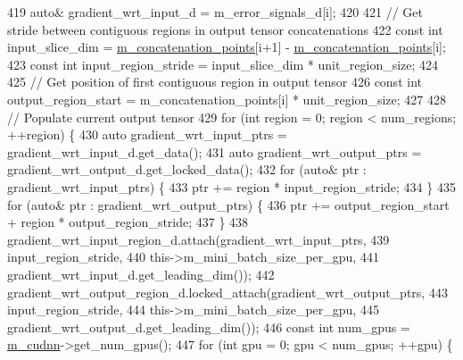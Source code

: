 \begin{DoxyCode}
419       \textcolor{keyword}{auto}& gradient\_wrt\_input\_d = m\_error\_signals\_d[i];
420 
421       \textcolor{comment}{// Get stride between contiguous regions in output tensor concatenations}
422       \textcolor{keyword}{const} \textcolor{keywordtype}{int} input\_slice\_dim = \hyperlink{classlbann_1_1concatenation__layer_a363324fe6cd104740334f3396085328c}{m\_concatenation\_points}[i+1] - 
      \hyperlink{classlbann_1_1concatenation__layer_a363324fe6cd104740334f3396085328c}{m\_concatenation\_points}[i];
423       \textcolor{keyword}{const} \textcolor{keywordtype}{int} input\_region\_stride = input\_slice\_dim * unit\_region\_size;
424 
425       \textcolor{comment}{// Get position of first contiguous region in output tensor}
426       \textcolor{keyword}{const} \textcolor{keywordtype}{int} output\_region\_start = m\_concatenation\_points[i] * unit\_region\_size;
427 
428       \textcolor{comment}{// Populate current output tensor}
429       \textcolor{keywordflow}{for} (\textcolor{keywordtype}{int} region = 0; region < num\_regions; ++region) \{
430         \textcolor{keyword}{auto} gradient\_wrt\_input\_ptrs = gradient\_wrt\_input\_d.get\_data();
431         \textcolor{keyword}{auto} gradient\_wrt\_output\_ptrs = gradient\_wrt\_output\_d.get\_locked\_data();
432         \textcolor{keywordflow}{for} (\textcolor{keyword}{auto}& ptr : gradient\_wrt\_input\_ptrs) \{
433           ptr += region * input\_region\_stride;
434         \}
435         \textcolor{keywordflow}{for} (\textcolor{keyword}{auto}& ptr : gradient\_wrt\_output\_ptrs) \{
436           ptr += output\_region\_start + region * output\_region\_stride;
437         \}
438         gradient\_wrt\_input\_region\_d.attach(gradient\_wrt\_input\_ptrs,
439                                            input\_region\_stride,
440                                            this->m\_mini\_batch\_size\_per\_gpu,
441                                            gradient\_wrt\_input\_d.get\_leading\_dim());
442         gradient\_wrt\_output\_region\_d.locked\_attach(gradient\_wrt\_output\_ptrs,
443                                                    input\_region\_stride,
444                                                    this->m\_mini\_batch\_size\_per\_gpu,
445                                                    gradient\_wrt\_output\_d.get\_leading\_dim());
446         \textcolor{keyword}{const} \textcolor{keywordtype}{int} num\_gpus = \hyperlink{classlbann_1_1Layer_a08dbb94239e3b8c96329786c57c72e21}{m\_cudnn}->get\_num\_gpus();
447         \textcolor{keywordflow}{for} (\textcolor{keywordtype}{int} gpu = 0; gpu < num\_gpus; ++gpu) \{

\end{DoxyCode}
